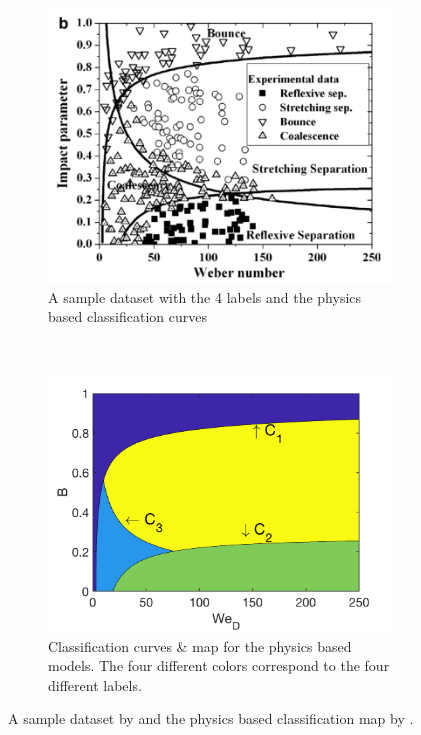 \documentclass{article}
\begin{document}
\begin{figure}[h!]
    \centering
    \begin{subfigure}[b]{0.45\textwidth}
        \includegraphics[width=\textwidth]{figures/munnannur.png}
        \caption{A sample dataset with the 4 labels and the physics based classification curves}
        \label{fig:munnannur_a}
    \end{subfigure}
    ~ %
    \begin{subfigure}[b]{0.45\textwidth}
        \includegraphics[width=\textwidth]{figures/regimes.png}
        \caption{Classification curves \& map for the physics based models. The four different colors correspond to the four different labels.}
        \label{fig:regime}
    \end{subfigure}
    \caption{A sample dataset by \citet{munnannur2007new} and the physics based classification map by \citet{agarwal2019computational}.}
    \label{fig:munnannur}
\end{figure}
\end{document}
